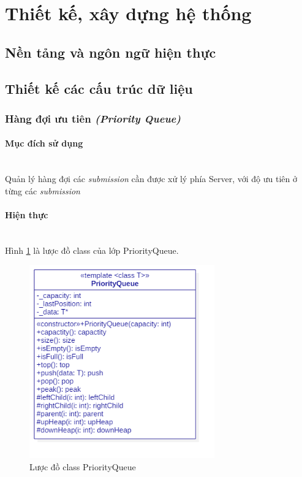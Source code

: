 \section{Thiết kế, xây dựng hệ thống}

\subsection{Nền tảng và ngôn ngữ hiện thực}

\subsection{Thiết kế các cấu trúc dữ liệu}

\subsubsection{Hàng đợi ưu tiên \textit{(Priority Queue)}}

\paragraph{Mục đích sử dụng\\\\}

Quản lý hàng đợi các \textit{submission} cần được xử lý phía Server, với độ ưu tiên ở từng các \textit{submission}

\paragraph{Hiện thực\\\\}

Hình \ref{fig:class_priorityqueue} là lược đồ class của lớp PriorityQueue.

\begin{figure}[tph]
	\centering
	\includegraphics[width=8cm]{ClassDiagram/PriorityQueue}
	\vspace{0.3cm}
	\caption{Lược đồ class PriorityQueue}
	\label{fig:class_priorityqueue}
\end{figure}

